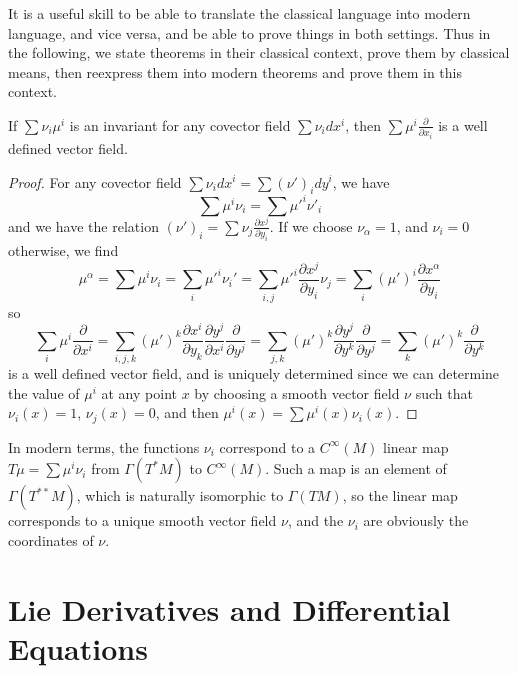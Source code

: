 It is a useful skill to be able to translate the classical language into modern language, and vice versa, and be able to prove things in both settings. Thus in the following, we state theorems in their classical context, prove them by classical means, then reexpress them into modern theorems and prove them in this context.

\begin{theorem}
    If $\sum \nu_i \mu^i$ is an invariant for any covector field $\sum \nu_i dx^i$, then $\sum \mu^i \frac{\partial}{\partial x_i}$ is a well defined vector field.
\end{theorem}
\begin{proof}
    For any covector field $\sum \nu_i dx^i = \sum (\nu')_i dy^i$, we have
    \[ \sum \mu^i \nu_i = \sum \mu'^i \nu'_i \]
    and we have the relation $(\nu')_i = \sum \nu_j \frac{\partial x^j}{\partial y_i}$. If we choose $\nu_\alpha = 1$, and $\nu_i = 0$ otherwise, we find
    \[ \mu^\alpha = \sum \mu^i \nu_i = \sum_i \mu'^i \nu_i' = \sum_{i,j} \mu'^i \frac{\partial x^j}{\partial y_i} \nu_j = \sum_i (\mu')^i \frac{\partial x^\alpha}{\partial y_i} \]
    so
    \[ \sum_i \mu^i \frac{\partial}{\partial x^i} = \sum_{i,j,k} (\mu')^k \frac{\partial x^i}{\partial y_k} \frac{\partial y^j}{\partial x^i} \frac{\partial}{\partial y^j} = \sum_{j,k} (\mu')^k \frac{\partial y^j}{\partial y^k} \frac{\partial}{\partial y^j} = \sum_k (\mu')^k \frac{\partial}{\partial y^k} \]
    is a well defined vector field, and is uniquely determined since we can determine the value of $\mu^i$ at any point $x$ by choosing a smooth vector field $\nu$ such that $\nu_i(x) = 1$, $\nu_j(x) = 0$, and then $\mu^i(x) = \sum \mu^i(x) \nu_i(x)$.
\end{proof}

\begin{remark}
    In modern terms, the functions $\nu_i$ correspond to a $C^\infty(M)$ linear map $T\mu = \sum \mu^i \nu_i$ from $\Gamma(T^*M)$ to $C^\infty(M)$. Such a map is an element of $\Gamma(T^{**}M)$, which is naturally isomorphic to $\Gamma(TM)$, so the linear map corresponds to a unique smooth vector field $\nu$, and the $\nu_i$ are obviously the coordinates of $\nu$.
\end{remark}









\chapter{Lie Derivatives and Differential Equations}

